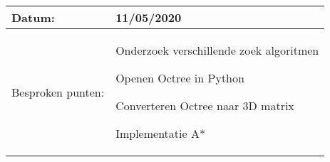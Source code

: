 \begin{tabularx}{\textwidth}{| l | X |}
  \hline
  Datum: & 11/05/2020\\
  \hline
  Besproken punten: &
  \begin{compactitem}
    \item Onderzoek verschillende zoek algoritmen
    \item Openen Octree in Python
    \item Converteren Octree naar 3D matrix
    \item Implementatie A*
  \end{compactitem}\\
  \hline
\end{tabularx}